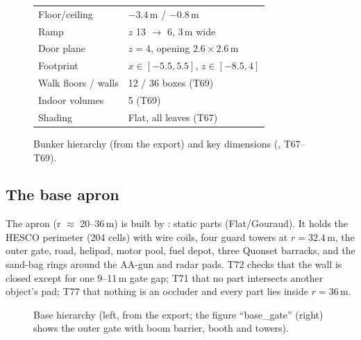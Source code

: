 \begin{figure}[h]
\centering
\begin{minipage}[t]{0.52\linewidth}\vspace{0pt}\end{minipage}\hfill
\begin{minipage}[t]{0.44\linewidth}\vspace{0pt}
\footnotesize
\begin{tabular}{@{}ll@{}}\toprule
Floor/ceiling & $-3.4$\,m / $-0.8$\,m\\
Ramp & $z$ 13 $\to$ 6, 3\,m wide\\
Door plane & $z=4$, opening $2.6\times2.6$\,m\\
Footprint & $x\in[-5.5,5.5]$, $z\in[-8.5,4]$\\
Walk floors / walls & 12 / 36 boxes (T69)\\
Indoor volumes & 5 (T69)\\
Shading & Flat, all leaves (T67)\\\bottomrule
\end{tabular}
\end{minipage}
\caption{Bunker hierarchy (from the export) and key dimensions (, T67--T69).}
\label{fig:tree-bunker}
\end{figure}

\subsection{The base apron}
The apron (r $\approx$ 20--36\,m) is built by : \partsBase{} static parts (Flat/Gouraud). It holds the HESCO perimeter (204 cells) with
wire coils, four guard towers at $r=32.4$\,m, the outer gate, road, helipad, motor pool, fuel depot, three Quonset barracks, and the sand-bag rings around the AA-gun
and radar pads. T72 checks that the wall is closed except for one 9--11\,m gate gap; T71 that no part
intersects another object's pad; T77 that nothing is an occluder and every part lies inside $r=36$\,m.

\begin{figure}[h]
\centering
\begin{minipage}[t]{0.56\linewidth}\vspace{0pt}\end{minipage}\hfill
\begin{minipage}[t]{0.40\linewidth}\vspace{0pt}
\captionsetup{type=figure}
\end{minipage}
\caption{Base hierarchy (left, from the export; the figure ``base\_gate'' (right) shows the outer gate with boom
barrier, booth and towers).}
\end{figure}


